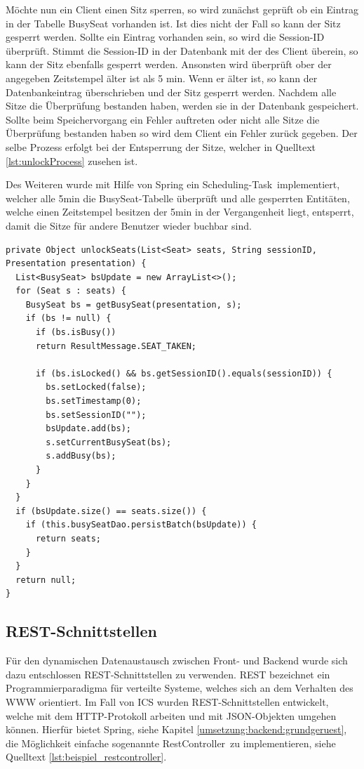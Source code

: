	Möchte nun ein Client einen Sitz sperren, so wird zunächst geprüft ob ein Eintrag in der Tabelle BusySeat vorhanden ist. Ist dies nicht der Fall so kann der Sitz gesperrt werden. Sollte ein Eintrag vorhanden sein, so wird die Session-ID überprüft. Stimmt die Session-ID in der Datenbank mit der des Client überein, so kann der Sitz ebenfalls gesperrt werden. Ansonsten wird überprüft ober der angegeben Zeitstempel älter ist als 5 min. Wenn er älter ist, so kann der Datenbankeintrag überschrieben und der Sitz gesperrt werden. Nachdem alle Sitze die Überprüfung bestanden haben, werden sie in der Datenbank gespeichert. Sollte beim Speichervorgang ein Fehler auftreten oder nicht alle Sitze die Überprüfung bestanden haben so wird dem Client ein Fehler zurück gegeben. Der selbe Prozess erfolgt bei der Entsperrung der Sitze, welcher in Quelltext  \ref{lst:unlockProcess} zusehen ist.
	
	Des Weiteren wurde mit Hilfe von Spring ein \glqq Scheduling-Task\grqq \, implementiert, welcher alle 5min die BusySeat-Tabelle überprüft und alle gesperrten Entitäten, welche einen Zeitstempel besitzen der 5min in der Vergangenheit liegt, entsperrt, damit die Sitze für andere Benutzer wieder buchbar sind.

\begin{lstlisting}[caption={Implementierung zum Entsperren von Sitzen}, label={lst:unlockProcess}]
private Object unlockSeats(List<Seat> seats, String sessionID, Presentation presentation) {
  List<BusySeat> bsUpdate = new ArrayList<>();
  for (Seat s : seats) {
    BusySeat bs = getBusySeat(presentation, s);
    if (bs != null) {
      if (bs.isBusy())
      return ResultMessage.SEAT_TAKEN;

      if (bs.isLocked() && bs.getSessionID().equals(sessionID)) {
        bs.setLocked(false);
        bs.setTimestamp(0);
        bs.setSessionID("");
        bsUpdate.add(bs);
        s.setCurrentBusySeat(bs);
        s.addBusy(bs);
      }
    }  
  }
  if (bsUpdate.size() == seats.size()) {
    if (this.busySeatDao.persistBatch(bsUpdate)) {
      return seats;
    }
  }
  return null;
}
\end{lstlisting}

	\subsection{REST-Schnittstellen}
	Für den dynamischen Datenaustausch zwischen Front- und Backend wurde sich dazu entschlossen \ac{REST}-Schnittstellen zu verwenden. \ac{REST} bezeichnet ein Programmierparadigma für verteilte Systeme, welches sich an dem Verhalten des \ac{WWW} orientiert.\autocite{REST} Im Fall von \ac{ICS} wurden \ac{REST}-Schnittstellen entwickelt, welche mit dem \ac{HTTP}-Protokoll arbeiten und mit \ac{JSON}-Objekten umgehen können. Hierfür bietet Spring, siehe Kapitel \ref{umsetzung:backend:grundgeruest}, die Möglichkeit einfache sogenannte \glqq RestController\grqq \, zu implementieren, siehe Quelltext \ref{lst:beispiel_restcontroller}.
	
